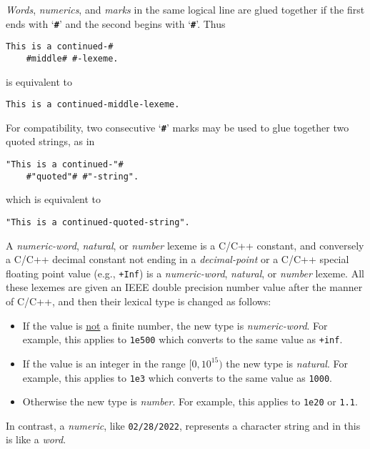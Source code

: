 \documentclass[12pt]{article}
\newcommand{\TT}[1]{{\tt \bfseries #1}}
\newenvironment{indpar}[1][0.3in]%
	{\begin{list}{}%
		     {\setlength{\itemsep}{0in}%
		      \setlength{\topsep}{0in}%
		      \setlength{\parsep}{1ex}%
		      \setlength{\labelwidth}{#1}%
		      \setlength{\leftmargin}{#1}%
		      \addtolength{\leftmargin}{\labelsep}}%
	 \item}%
	{\end{list}}
\begin{document}
{\em Words}, {\em numerics}, and {\em marks}
in the same logical line are glued together if the first
ends with `\TT{\#}' and the second begins with `\TT{\#}'.
Thus
\begin{indpar}\begin{verbatim}
This is a continued-#
    #middle# #-lexeme.
\end{verbatim}\end{indpar}
is equivalent to
\begin{indpar}\begin{verbatim}
This is a continued-middle-lexeme.
\end{verbatim}\end{indpar}
For compatibility, two consecutive `\TT{\#}' marks may be used
to glue together two quoted strings, as in
\begin{indpar}\begin{verbatim}
"This is a continued-"#
    #"quoted"# #"-string".
\end{verbatim}\end{indpar}
which is equivalent to
\begin{indpar}\begin{verbatim}
"This is a continued-quoted-string".
\end{verbatim}\end{indpar}


A {\em numeric-word}, {\em natural}, or {\em number} lexeme
is a C/C++ constant, and 
conversely a C/C++ decimal constant
not ending in a {\em decimal-point}
or a C/C++ special floating point value (e.g., {\tt +Inf})
is a {\em numeric-word}, {\em natural}, or {\em number} lexeme.
All these lexemes are given an IEEE double precision number value
after the manner of C/C++, and then their lexical type is changed
as follows:
\begin{itemize}\label{LEXEME-TYPE-CONVERSION}
\item If the value is \underline{not} a finite number, the
new type is {\em numeric-word}.  For example, this applies to {\tt 1e500}
which converts to the same value as {\tt +inf}.
\item If the value is an integer in the range $[0,10^{15})$ the new
type is {\em natural}.
For example, this applies to {\tt 1e3}
which converts to the same value as {\tt 1000}.
\item Otherwise the new type is {\em number}.
For example, this applies to {\tt 1e20} or {\tt 1.1}.
\end{itemize}

In contrast, a {\em numeric}, like {\tt 02/28/2022},
represents a character string and in this
is like a {\em word}.
\end{document}
